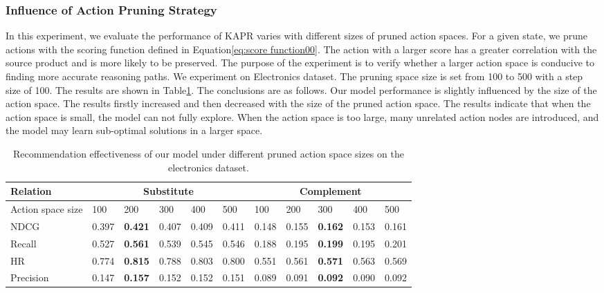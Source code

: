 \documentclass[review]{elsarticle}
\begin{document}
\begin{sloppypar}
\subsubsection{Influence of Action Pruning Strategy}
In this experiment, we evaluate the performance of KAPR varies with different sizes of pruned action spaces.
For a given state, we prune actions with the scoring function defined in Equation\ref{eq:score function00}.
The action with a larger score has a greater correlation with the source product and is more likely to be preserved. The purpose of the experiment is to verify whether a larger action space is conducive to finding more accurate reasoning paths. We experiment on Electronics dataset. The pruning space size is set from 100 to 500 with a step size of 100. The results are shown in Table\ref{pruning}. The conclusions are as follows. Our model performance is slightly influenced by the size of the action space. The results firstly increased and then decreased with the size of the pruned action space. The results indicate that when the action space is small, the model can not fully explore. When the action space is too large, many unrelated action nodes are introduced, and the model may learn sub-optimal solutions in a larger space.
\begin{table}[]
\caption{Recommendation effectiveness of our model under different pruned action space sizes on the electronics dataset.}
\setlength{\tabcolsep}{1mm}
\small
\begin{tabular}{l|lllll|lllll}
\hline
Relation          & \multicolumn{5}{c|}{Substitute}                & \multicolumn{5}{c}{Complement}                 \\ \hline
Action space size & 100   & 200            & 300   & 400   & 500   & 100   & 200   & 300            & 400   & 500   \\ \hline
NDCG              & 0.397 & \textbf{0.421} & 0.407 & 0.409 & 0.411 & 0.148 & 0.155 & \textbf{0.162} & 0.153 & 0.161 \\
Recall            & 0.527 & \textbf{0.561} & 0.539 & 0.545 & 0.546 & 0.188 & 0.195 & \textbf{0.199} & 0.195 & 0.201 \\
HR                & 0.774 & \textbf{0.815} & 0.788 & 0.803 & 0.800 & 0.551 & 0.561 & \textbf{0.571} & 0.563 & 0.569 \\
Precision         & 0.147 & \textbf{0.157} & 0.152 & 0.152 & 0.151 & 0.089 & 0.091 & \textbf{0.092} & 0.090 & 0.092 \\ \hline
\end{tabular}
\label{pruning}
\end{table}


\end{sloppypar}
\end{document}
